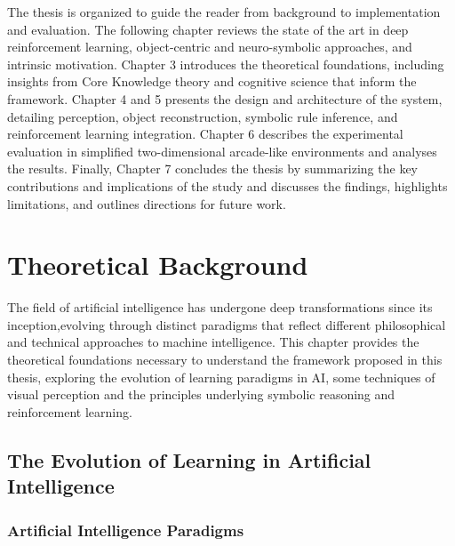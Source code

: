 \documentclass[12pt,a4paper]{report}
\begin{document}
The thesis is organized to guide the reader from background to implementation and evaluation. The following chapter reviews the state of the art in deep reinforcement learning, object-centric and neuro-symbolic approaches, and intrinsic motivation. Chapter 3 introduces the theoretical foundations, including insights from Core Knowledge theory and cognitive science that inform the framework. Chapter 4 and 5 presents the design and architecture of the system, detailing perception, object reconstruction, symbolic rule inference, and reinforcement learning integration. Chapter 6 describes the experimental evaluation in simplified two-dimensional arcade-like environments and analyses the results. Finally, Chapter 7 concludes the thesis by summarizing the key contributions and implications of the study and discusses the findings, highlights limitations, and outlines directions for future work. 


\chapter{Theoretical Background}

The field of artificial intelligence has undergone deep transformations since its inception,evolving through distinct paradigms that reflect different philosophical and technical approaches to machine intelligence. This chapter provides the theoretical foundations necessary to understand the framework proposed in this thesis, exploring the evolution of learning paradigms in AI, some techniques of visual perception and the principles underlying symbolic reasoning and reinforcement learning.

\section{The Evolution of Learning in Artificial Intelligence}
\subsection{Artificial Intelligence Paradigms}
\end{document}
